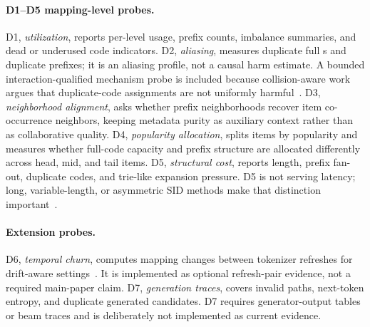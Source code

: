 \paragraph{D1--D5 mapping-level probes.}
D1, \emph{utilization}, reports per-level usage, prefix counts, imbalance
summaries, and dead or underused code indicators. D2, \emph{aliasing},
measures duplicate full \sid{}s and duplicate prefixes; it is an aliasing
profile, not a causal harm estimate. A bounded interaction-qualified mechanism
probe is included because collision-aware work argues that duplicate-code
assignments are not uniformly harmful~\cite{hu2026quasid}. D3, \emph{neighborhood alignment}, asks
whether prefix neighborhoods recover item co-occurrence neighbors, keeping
metadata purity as auxiliary context rather than as collaborative quality. D4,
\emph{popularity allocation}, splits items by popularity and measures whether
full-code capacity and prefix structure are allocated differently across head,
mid, and tail items. D5, \emph{structural cost}, reports \sid length, prefix
fan-out, duplicate codes, and trie-like expansion pressure. D5 is not serving
latency; long, variable-length, or asymmetric SID methods make that distinction
important~\cite{xia2026acerec,cheng2026capsid,huang2026asymrec,zhang2026hgrec}.

\paragraph{Extension probes.}
D6, \emph{temporal churn}, computes mapping changes between tokenizer
refreshes for drift-aware settings~\cite{feng2026dact,baikalov2026staleness}.
It is implemented as optional refresh-pair evidence, not a required main-paper
claim.
D7, \emph{generation traces}, covers invalid paths, next-token entropy, and
duplicate generated candidates. D7 requires generator-output tables or beam
traces and is deliberately not implemented as current evidence.

